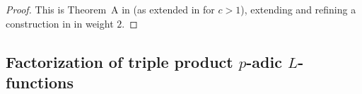 \documentclass[10pt,letterpaper]{amsart}
\theoremstyle{plain}
\theoremstyle{definition}
\theoremstyle{definition}
\theoremstyle{plain}
\theoremstyle{plain}
\theoremstyle{plain}
\theoremstyle{remark}
\newtheorem{rem}[thm]{Remark}
\numberwithin{equation}{section}
\DeclareMathOperator{\BD}{BD} %
\def\cO{\mathcal O}
\newcommand{\dBr}[1]{\llbracket{#1}\rrbracket}
\begin{document}
\begin{proof}
This is Theorem~A in \cite{ChHs1} (as extended in \cite[Thm.~A]{hung} for $c>1$), extending and refining a construction in \cite{BDmumford-tate} in weight $2$. 
\end{proof}





\subsection{Factorization of triple product \texorpdfstring{$p$}{p}-adic \texorpdfstring{$L$}{L}-functions}\label{subsec:factor-L-def}

%
\end{document}
